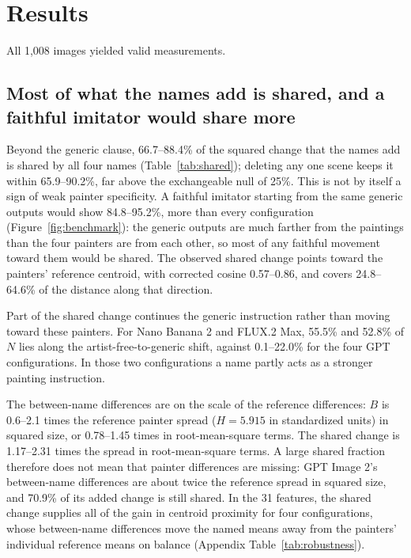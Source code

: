\documentclass[10pt]{article}
\begin{document}
\section{Results}\label{sec:results}

All 1,008 images yielded valid measurements.

\subsection{Most of what the names add is shared, and a faithful imitator would share more}\label{sec:shared}



Beyond the generic clause, 66.7--88.4\% of the squared change that the names add is shared
by all four names (Table~\ref{tab:shared}); deleting any one scene keeps it within
65.9--90.2\%, far above the exchangeable null of 25\%. This is not by itself a sign of weak
painter specificity. A faithful imitator starting from the same generic outputs would show
84.8--95.2\%, more than every configuration (Figure~\ref{fig:benchmark}): the generic outputs
are much farther from the paintings than the four painters are from each other, so most of
any faithful movement toward them would be shared. The observed shared change points toward
the painters' reference centroid, with corrected cosine 0.57--0.86, and covers 24.8--64.6\%
of the distance along that direction.

Part of the shared change continues the generic instruction rather than moving toward these
painters. For Nano Banana 2 and FLUX.2 Max, 55.5\% and 52.8\% of $N$ lies along the
artist-free-to-generic shift, against 0.1--22.0\% for the four GPT configurations. In those
two configurations a name partly acts as a stronger painting instruction.

The between-name differences are on the scale of the reference differences: $B$ is 0.6--2.1
times the reference painter spread ($H=5.915$ in standardized units) in squared size, or 0.78--1.45 times in root-mean-square
terms. The shared change is 1.17--2.31 times the spread in root-mean-square terms. A large
shared fraction therefore does not mean that painter differences are missing: GPT Image 2's
between-name differences are about twice the reference spread in squared size, and 70.9\% of
its added change is still shared. In the 31 features, the shared change supplies all of the
gain in centroid proximity for four configurations, whose between-name differences move the
named means away from the painters' individual reference means on balance (Appendix
Table~\ref{tab:robustness}).
\end{document}
